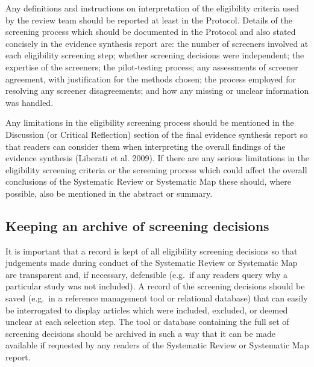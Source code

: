 \documentclass[
  letterpaper,
  DIV=11,
  numbers=noendperiod]{scrreprt}
\begin{document}
Any definitions and instructions on interpretation of the eligibility
criteria used by the review team should be reported at least in the
Protocol. Details of the screening process which should be documented in
the Protocol and also stated concisely in the evidence synthesis report
are: the number of screeners involved at each eligibility screening
step; whether screening decisions were independent; the expertise of the
screeners; the pilot-testing process; any assessments of screener
agreement, with justification for the methods chosen; the process
employed for resolving any screener disagreements; and how any missing
or unclear information was handled.

Any limitations in the eligibility screening process should be mentioned
in the Discussion (or Critical Reflection) section of the final evidence
synthesis report so that readers can consider them when interpreting the
overall findings of the evidence synthesis (Liberati et al. 2009). If
there are any serious limitations in the eligibility screening criteria
or the screening process which could affect the overall conclusions of
the Systematic Review or Systematic Map these should, where possible,
also be mentioned in the abstract or summary.

\subsection{Keeping an archive of screening
decisions}\label{keeping-an-archive-of-screening-decisions}

It is important that a record is kept of all eligibility screening
decisions so that judgements made during conduct of the Systematic
Review or Systematic Map are transparent and, if necessary, defensible
(e.g.~if any readers query why a particular study was not included). A
record of the screening decisions should be saved (e.g.~in a reference
management tool or relational database) that can easily be interrogated
to display articles which were included, excluded, or deemed unclear at
each selection step. The tool or database containing the full set of
screening decisions should be archived in such a way that it can be made
available if requested by any readers of the Systematic Review or
Systematic Map report.
\end{document}
